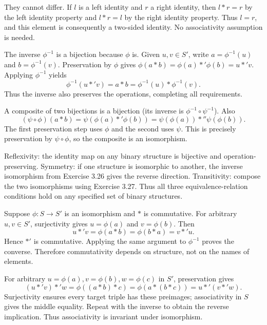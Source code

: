 
They cannot differ. If $l$ is a left identity and $r$ a right identity, then $l*r=r$ by the left identity property and $l*r=l$ by the right identity property. Thus $l=r$, and this element is consequently a two-sided identity. No associativity assumption is needed.


The inverse $\phi^{-1}$ is a bijection because $\phi$ is. Given $u,v\in S'$, write $a=\phi^{-1}(u)$ and $b=\phi^{-1}(v)$. Preservation by $\phi$ gives $\phi(a*b)=\phi(a)*'\phi(b)=u*'v$. Applying $\phi^{-1}$ yields
\[\phi^{-1}(u*'v)=a*b=\phi^{-1}(u)*\phi^{-1}(v).
\]
Thus the inverse also preserves the operations, completing all requirements.


A composite of two bijections is a bijection (its inverse is $\phi^{-1}\circ\psi^{-1}$). Also
\[(\psi\circ\phi)(a*b)=\psi(\phi(a)*'\phi(b))=\psi(\phi(a))*''\psi(\phi(b)).
\]
The first preservation step uses $\phi$ and the second uses $\psi$. This is precisely preservation by $\psi\circ\phi$, so the composite is an isomorphism.


Reflexivity: the identity map on any binary structure is bijective and operation-preserving. Symmetry: if one structure is isomorphic to another, the inverse isomorphism from Exercise 3.26 gives the reverse direction. Transitivity: compose the two isomorphisms using Exercise 3.27. Thus all three equivalence-relation conditions hold on any specified set of binary structures.


Suppose $\phi:S\to S'$ is an isomorphism and $*$ is commutative. For arbitrary $u,v\in S'$, surjectivity gives $u=\phi(a)$ and $v=\phi(b)$. Then
\[u*'v=\phi(a*b)=\phi(b*a)=v*'u.
\]
Hence $*'$ is commutative. Applying the same argument to $\phi^{-1}$ proves the converse. Therefore commutativity depends on structure, not on the names of elements.


For arbitrary $u=\phi(a),v=\phi(b),w=\phi(c)$ in $S'$, preservation gives
\[(u*'v)*'w=\phi((a*b)*c)=\phi(a*(b*c))=u*'(v*'w).
\]
Surjectivity ensures every target triple has these preimages; associativity in $S$ gives the middle equality. Repeat with the inverse to obtain the reverse implication. Thus associativity is invariant under isomorphism.

